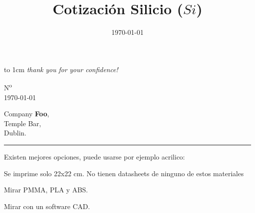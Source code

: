 \documentclass[a4paper]{article}
\title{Cotización Silicio ($Si$)}
\date{\today}
\makeatletter
\let\displayFont\relax
\let\thetitle\@title
\makeatother
\begin{document}
\parbox[b][2cm][t]{\rightalignment}{{\color{gray!95}\displayFont\fontsize{1.5cm}{1.5cm}\selectfont %
\vbox to 1cm{\vss %
%
\companyname{}%
%
}}
\vskip 3mm%
{\fontsize{0.44cm}{0.5cm}%
\emph{thank you for your confidence!}%
}
}%
%
\parbox[b][2cm][t]{0.35\textwidth}{}

\kern -5mm

\leavevmode\kern \rightalignment \parbox{0.35\textwidth}{\ttfamily N\textsuperscript{o} \invoicenum\\
\today }

\vskip 0.7cm

\leavevmode\kern \rightalignment\kern -3mm \colorbox{gray!85}{
  \kern 1mm\begin{minipage}[t]{0.5\textwidth}
    \color{white}
    \vskip 2mm
    Company \textbf{Foo},\\
    Temple Bar,\\
    Dublin.\\
    \vspace*{-3mm}%
  \end{minipage}
}

\vskip 2.3cm

\begin{center}
{\ttfamily\LARGE \thetitle}

\rule{2cm}{0.25pt}
\end{center}

Existen mejores opciones, puede usarse por ejemplo acrilico:

Se imprime solo 22x22 cm. No tienen datasheets de ninguno de estos materiales

Mirar PMMA, PLA y ABS.

Mirar con un software CAD.
\end{document}
